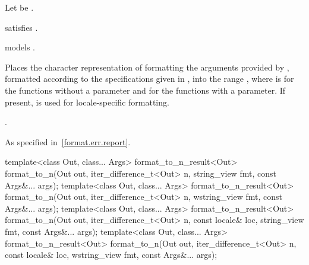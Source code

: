 \begin{itemdescr}
\pnum
Let  be .

\pnum
\constraints
{} satisfies .

\pnum
\expects
{} models .

\pnum
\effects
Places the character representation of formatting
the arguments provided by ,
formatted according to the specifications given in ,
into the range ,
where  is
 for the functions without a  parameter and
 for the functions with a  parameter.
If present,  is used for locale-specific formatting.

\pnum
\returns
{}.

\pnum
\throws
As specified in~\ref{format.err.report}.
\end{itemdescr}

%
\begin{itemdecl}
template<class Out, class... Args>
  format_to_n_result<Out> format_to_n(Out out, iter_difference_t<Out> n,
                                      string_view fmt, const Args&... args);
template<class Out, class... Args>
  format_to_n_result<Out> format_to_n(Out out, iter_difference_t<Out> n,
                                      wstring_view fmt, const Args&... args);
template<class Out, class... Args>
  format_to_n_result<Out> format_to_n(Out out, iter_difference_t<Out> n,
                                      const locale& loc, string_view fmt,
                                      const Args&... args);
template<class Out, class... Args>
  format_to_n_result<Out> format_to_n(Out out, iter_difference_t<Out> n,
                                      const locale& loc, wstring_view fmt,
                                      const Args&... args);
\end{itemdecl}

